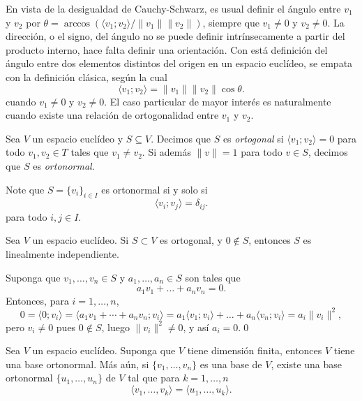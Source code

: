 \begin{obs}
En vista de la desigualdad de Cauchy-Schwarz, es usual definir el \'angulo entre $v_1$ y $v_2$ por $\theta=\arccos\left(\langle v_1;v_2\rangle/\|v_1\|\|v_2\|\right)$, siempre que $v_1\ne 0$ y $v_2\ne 0$. La direcci\'on, o el signo, del \'angulo no se puede definir intr\'insecamente a partir del producto interno, hace falta definir una orientaci\'on. Con est\'a definici\'on del \'angulo entre dos elementos distintos del origen en un espacio eucl\'ideo, se empata con la definici\'on cl\'asica, seg\'un la cual
\[
\langle v_1;v_2\rangle=\|v_1\|\|v_2\|\cos\theta.
\]
cuando $v_1\ne 0$ y $v_2\ne 0$. El caso particular de mayor inter\'es es naturalmente cuando existe una relaci\'on de ortogonalidad entre $v_1$ y $v_2$.
\end{obs}

\begin{defn}
Sea $V$ un espacio eucl\'ideo y $S\subseteq V$. Decimos que $S$ es \emph{ortogonal} si $\langle v_1;v_2\rangle=0$ para todo $v_1,v_2\in T$ tales que $v_1\ne v_2$. Si adem\'as $\|v\|=1$ para todo $v\in S$, decimos que $S$ es \emph{ortonormal}.
\end{defn}

\begin{obs}\label{ortokro}
Note que $S=\{v_i\}_{i\in I}$ es ortonormal si y solo si
\[
\langle v_i;v_j\rangle=\delta_{ij}.
\]
para todo $i,j\in I$.
\end{obs}

\begin{pro}\label{ortlinind}
Sea $V$ un espacio eucl\'ideo. Si $S\subset V$ es ortogonal, y $0\not\in S$, entonces $S$ es linealmente independiente.
\end{pro}

\dem Suponga que $v_1,\ldots,v_n\in S$ y $a_1,\ldots,a_n\in S$ son tales que
\[
a_1v_1+\ldots+a_nv_n=0.
\]
Entonces, para $i=1,\ldots,n$,
\[
0=\langle 0;v_i\rangle=\langle a_1v_1+\cdots+a_nv_n;v_i\rangle=a_1\langle v_1;v_i\rangle+\ldots+a_n\langle v_n;v_i\rangle=a_i\|v_i\|^2,
\]
pero $v_i\ne 0$ pues $0\not\in S$, luego $\|v_i\|^2\ne 0$, y as\'i $a_i=0$.\qed

\begin{teo}\label{gramsch}
Sea $V$ un espacio eucl\'ideo. Suponga que $V$ tiene dimensi\'on finita, entonces $V$ tiene una base ortonormal. M\'as a\'un, si $\{v_1,\ldots,v_n\}$ es una base de $V$, existe una base ortonormal $\{u_1,\ldots,u_n\}$ de $V$ tal que para $k=1,\ldots,n$
\[
\langle v_1,\ldots,v_k\rangle=\langle u_1,\ldots,u_k\rangle.
\]
\end{teo}

